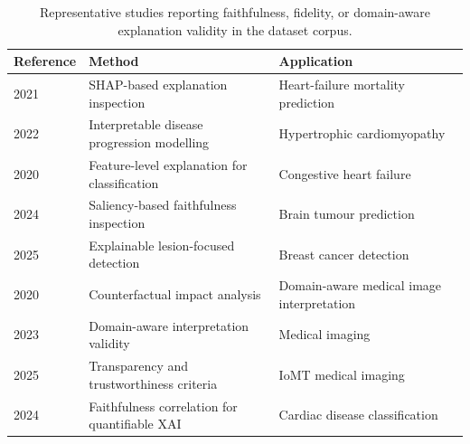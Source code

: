\begin{table}[H]
\centering
\caption{Representative studies reporting faithfulness, fidelity, or domain-aware explanation validity in the dataset corpus.}
\label{tab:faithfulness_metrics}
\renewcommand{\arraystretch}{1.2}
\begin{tabular}{p{3.0cm} p{5.6cm} p{5.4cm}}
\hline
\textbf{Reference} & \textbf{Method} & \textbf{Application} \\
\hline
\cite{Vazquez2021} 2021 & SHAP-based explanation inspection & Heart-failure mortality prediction \\
\cite{Piculin2022} 2022 & Interpretable disease progression modelling & Hypertrophic cardiomyopathy \\
\cite{Li2020} 2020 & Feature-level explanation for classification & Congestive heart failure \\
\cite{Nazir2024UtilizingCC} 2024 & Saliency-based faithfulness inspection & Brain tumour prediction \\
\cite{saharan2025explainable} 2025 & Explainable lesion-focused detection & Breast cancer detection \\
\cite{lenis2020domain} 2020 & Counterfactual impact analysis & Domain-aware medical image interpretation \\
\cite{10051650} 2023 & Domain-aware interpretation validity & Medical imaging \\
\cite{10328849} 2025 & Transparency and trustworthiness criteria & IoMT medical imaging \\
\cite{Pandey2024} 2024 & Faithfulness correlation for quantifiable XAI & Cardiac disease classification \\
\hline
\end{tabular}
\end{table}
